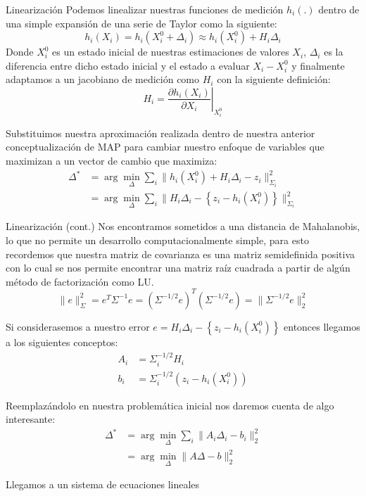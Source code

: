 \documentclass[10pt]{beamer}
\begin{document}
        \begin{frame}{Linearización}
            Podemos linealizar nuestras funciones de medición $h_i(.)$ dentro de una simple expansión de una serie de Taylor como la siguiente:
            \[
            h_i(X_i) = h_i(X^0_i + \Delta_i) \approx h_i(X^0_i) + H_i \Delta_i
            \]
            Donde $X^0_i$ es un estado inicial de nuestras estimaciones de valores $X_i$, $\Delta_i$ es la diferencia entre dicho estado inicial y el estado a evaluar $X_i - X^0_i$ y finalmente adaptamos a un jacobiano de medición como $H_i$ con la siguiente definición:
            \[
            H_i = \left.\frac{\partial h_i(X_i)}{\partial X_i}\right|_{X_i^0}
            \]

            Substituimos nuestra aproximación realizada dentro de nuestra anterior conceptualización de MAP para cambiar nuestro enfoque de variables que maximizan a un vector de cambio que maximiza:
            \[
            \begin{aligned}
                \Delta^* &= \arg\min_\Delta \sum_i \|h_i(X^0_i) + H_i\Delta_i - z_i \|^2_{\Sigma_i} \\
                &=  \arg\min_\Delta \sum_i \|H_i\Delta_i - \left\{z_i - h_i(X^0_i)\right\} \|^2_{\Sigma_i} 
            \end{aligned}
            \]
        \end{frame}

        \begin{frame}{Linearización (cont.)}
            Nos encontramos sometidos a una distancia de Mahalanobis, lo que no permite un desarrollo computacionalmente simple, para esto recordemos que
            nuestra matriz de covarianza es una matriz semidefinida positiva con lo cual se nos permite encontrar una matriz raíz cuadrada a partir de algún método de factorización como LU.
            \[
            \|e\|^2_\Sigma = e^T \Sigma^{-1} e = \left(\Sigma^{-1/2}e\right)^T \left(\Sigma^{-1/2}e\right) = \|\Sigma^{-1/2} e\|^2_2
            \]

            Si considerasemos a nuestro error $e = H_i\Delta_i - \left\{z_i - h_i(X^0_i)\right\}$ entonces llegamos a los siguientes conceptos:
            \[
            \begin{aligned}
                A_i &= \Sigma^{-1/2}_i H_i \\
                b_i &= \Sigma^{-1/2}_i \left(z_i - h_i(X^0_i)\right)
            \end{aligned}
            \]

            Reemplazándolo en nuestra problemática inicial nos daremos cuenta de algo interesante:
            \[
                \begin{aligned}
                    \Delta^* &= \arg\min_\Delta \sum_i \|A_i \Delta_i - b_i \|^2_2 \\
                    &=  \arg\min_\Delta \|A \Delta - b \|^2_2 
                \end{aligned}
            \]

            Llegamos a un sistema de ecuaciones lineales

        \end{frame}
        
\end{document}
